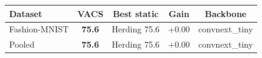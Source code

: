 \begin{tabular}{lcccc}
\toprule
Dataset & VACS & Best static & Gain & Backbone \\
\midrule
Fashion-MNIST & \textbf{75.6} & Herding 75.6 & +0.00 & convnext\_tiny \\
Pooled & \textbf{75.6} & Herding 75.6 & +0.00 & convnext\_tiny \\
\bottomrule
\end{tabular}
